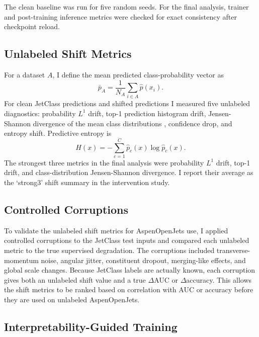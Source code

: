 \documentclass[11pt]{article}
\begin{document}
The clean baseline was run for five random seeds. For the final analysis, trainer and post-training inference metrics were checked for exact consistency after checkpoint reload.


\subsection{Unlabeled Shift Metrics}

For a dataset $A$, I define the mean predicted class-probability vector as 
\begin{equation}
\bar{p}_{A} = \frac{1}{N_A}\sum_{i\in A}\hat{p}(x_i).
\end{equation}
For clean JetClass predictions and shifted predictions I measured five unlabeled diagnostics: probability $L^1$ drift, top-1 prediction histogram drift, Jensen-Shannon divergence of the mean class distributions \cite{lin1991divergence}, confidence drop, and entropy shift.  Predictive entropy is
\begin{equation}
H(x) = -\sum_{c=1}^{C}\hat{p}_c(x)\log \hat{p}_c(x).
\end{equation}
The strongest three metrics in the final analysis were probability $L^1$ drift, top-1 drift, and class-distribution Jensen-Shannon divergence. I report their average as the ‘strong3’ shift summary in the intervention study.


\subsection{Controlled Corruptions}

To validate the unlabeled shift metrics for AspenOpenJets use, I applied controlled corruptions to the JetClass test inputs and compared each unlabeled metric to the true supervised degradation. The corruptions included transverse-momentum noise, angular jitter, constituent dropout, merging-like effects, and global scale changes. Because JetClass labels are actually known, each corruption gives both an unlabeled shift value and a true $\Delta$AUC or $\Delta$accuracy. This allows the shift metrics to be ranked based on correlation with AUC or accuracy before they are used on unlabeled AspenOpenJets.

\subsection{Interpretability-Guided Training}
\end{document}

